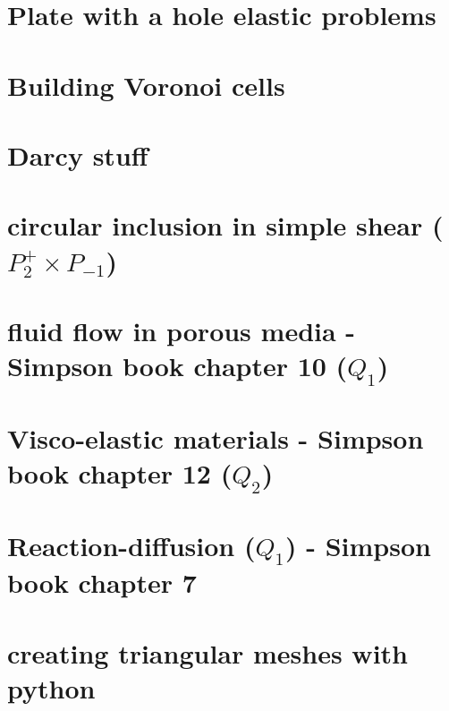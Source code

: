 \documentclass[a4paper,11pt]{report}
\begin{document}
\chapter{Plate with a hole elastic problems \label{f124}}

\chapter{Building Voronoi cells \label{f125}}

\chapter{Darcy stuff\label{f126}}

\chapter{circular inclusion in simple shear ($P_2^+\times P_{-1}$)\label{f127}}

\chapter{fluid flow in porous media - Simpson book chapter 10 ($Q_1$)\label{f128}}

\chapter{Visco-elastic materials - Simpson book chapter 12 ($Q_2$)\label{f129}}

\chapter{Reaction-diffusion ($Q_1$) - Simpson book chapter 7\label{f130}}

\chapter{creating triangular meshes with python \label{f131}}
\end{document}
